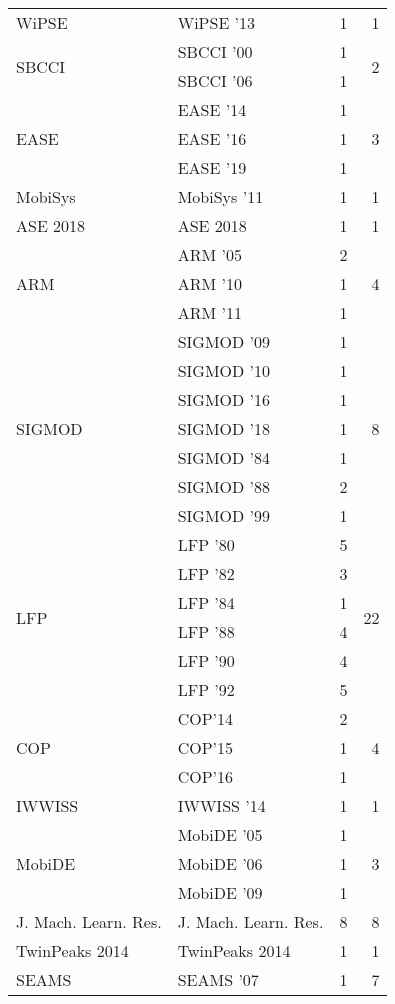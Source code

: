 \begin{table*}[t]
\begin{tabular}{llrr}
\multirow{1}{*}{WiPSE } & WiPSE '13 & 1 & \multirow{1}{*}{1}\\
\multirow{2}{*}{SBCCI } & SBCCI '00 & 1 & \multirow{2}{*}{2}\\
& SBCCI '06 & 1 &\\
\multirow{3}{*}{EASE } & EASE '14 & 1 & \multirow{3}{*}{3}\\
& EASE '16 & 1 &\\
& EASE '19 & 1 &\\
\multirow{1}{*}{MobiSys } & MobiSys '11 & 1 & \multirow{1}{*}{1}\\
\multirow{1}{*}{ASE 2018} & ASE 2018 & 1 & \multirow{1}{*}{1}\\
\multirow{3}{*}{ARM } & ARM '05 & 2 & \multirow{3}{*}{4}\\
& ARM '10 & 1 &\\
& ARM '11 & 1 &\\
\multirow{7}{*}{SIGMOD } & SIGMOD '09 & 1 & \multirow{7}{*}{8}\\
& SIGMOD '10 & 1 &\\
& SIGMOD '16 & 1 &\\
& SIGMOD '18 & 1 &\\
& SIGMOD '84 & 1 &\\
& SIGMOD '88 & 2 &\\
& SIGMOD '99 & 1 &\\
\multirow{6}{*}{LFP } & LFP '80 & 5 & \multirow{6}{*}{22}\\
& LFP '82 & 3 &\\
& LFP '84 & 1 &\\
& LFP '88 & 4 &\\
& LFP '90 & 4 &\\
& LFP '92 & 5 &\\
\multirow{3}{*}{COP} & COP'14 & 2 & \multirow{3}{*}{4}\\
& COP'15 & 1 &\\
& COP'16 & 1 &\\
\multirow{1}{*}{IWWISS } & IWWISS '14 & 1 & \multirow{1}{*}{1}\\
\multirow{3}{*}{MobiDE } & MobiDE '05 & 1 & \multirow{3}{*}{3}\\
& MobiDE '06 & 1 &\\
& MobiDE '09 & 1 &\\
\multirow{1}{*}{J. Mach. Learn. Res.} & J. Mach. Learn. Res. & 8 & \multirow{1}{*}{8}\\
\multirow{1}{*}{TwinPeaks 2014} & TwinPeaks 2014 & 1 & \multirow{1}{*}{1}\\
\multirow{5}{*}{SEAMS } & SEAMS '07 & 1 & \multirow{5}{*}{7}\\

\end{tabular}
\end{table*}

